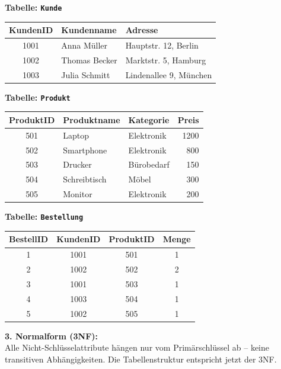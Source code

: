 \documentclass[a4paper,12pt]{article}
\begin{document}
\begin{enumerate}
		\textbf{Tabelle: \texttt{Kunde}}
		
		\begin{center}
			\begin{tabular}{|c|l|l|}
				\hline
				KundenID & Kundenname & Adresse \\
				\hline
				1001 & Anna Müller & Hauptstr. 12, Berlin \\
				1002 & Thomas Becker & Marktstr. 5, Hamburg \\
				1003 & Julia Schmitt & Lindenallee 9, München \\
				\hline
			\end{tabular}
		\end{center}
		
		\textbf{Tabelle: \texttt{Produkt}}
		
		\begin{center}
			\begin{tabular}{|c|l|l|r|}
				\hline
				ProduktID & Produktname & Kategorie & Preis \\
				\hline
				501 & Laptop & Elektronik & 1200 \\
				502 & Smartphone & Elektronik & 800 \\
				503 & Drucker & Bürobedarf & 150 \\
				504 & Schreibtisch & Möbel & 300 \\
				505 & Monitor & Elektronik & 200 \\
				\hline
			\end{tabular}
		\end{center}
		
		\textbf{Tabelle: \texttt{Bestellung}}
		
		\begin{center}
			\begin{tabular}{|c|c|c|c|}
				\hline
				BestellID & KundenID & ProduktID & Menge \\
				\hline
				1 & 1001 & 501 & 1 \\
				2 & 1002 & 502 & 2 \\
				3 & 1001 & 503 & 1 \\
				4 & 1003 & 504 & 1 \\
				5 & 1002 & 505 & 1 \\
				\hline
			\end{tabular}
		\end{center}
		
		\vspace{1em}
		\textbf{3. Normalform (3NF):} \\
		Alle Nicht-Schlüsselattribute hängen nur vom Primärschlüssel ab – keine transitiven Abhängigkeiten. Die Tabellenstruktur entspricht jetzt der 3NF.
		

\end{enumerate}
\end{document}

